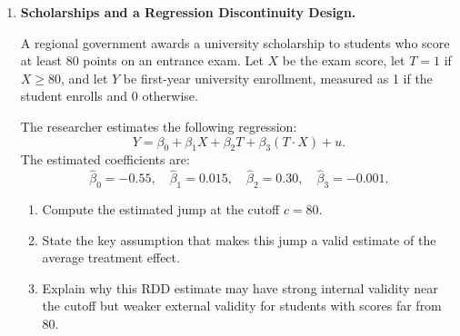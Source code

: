 \documentclass[12pt]{article}
\begin{document}
\begin{enumerate}
\begin{enumerate}[label=(\alph*)]
        \item The treatment effect is the predicted difference between \(T=1\) and \(T=0\), holding baseline political interest fixed:
        \[
            (\beta_0 + \beta_1 + \beta_2\text{interest} + \beta_3\text{interest})
            - (\beta_0 + \beta_2\text{interest})
            = \beta_1 + \beta_3\text{interest}.
        \]
        For \(\text{interest}=4\), the treatment effect is
        \[
            \beta_1 + 4\beta_3.
        \]
    \end{enumerate}
    \fi \color{black}

    \item \textbf{Scholarships and a Regression Discontinuity Design.}

    A regional government awards a university scholarship to students who score at least 80 points on an entrance exam. Let \(X\) be the exam score, let \(T=1\) if \(X \geq 80\), and let \(Y\) be first-year university enrollment, measured as 1 if the student enrolls and 0 otherwise.

    The researcher estimates the following regression:
    \[
        Y = \beta_0 + \beta_1X + \beta_2T + \beta_3(T\cdot X) + u.
    \]
    The estimated coefficients are:
    \[
        \widehat\beta_0 = -0.55, \quad
        \widehat\beta_1 = 0.015, \quad
        \widehat\beta_2 = 0.30, \quad
        \widehat\beta_3 = -0.001.
    \]

    \begin{enumerate}[label=(\alph*)]
        \item Compute the estimated jump at the cutoff \(c=80\).
        \item State the key assumption that makes this jump a valid estimate of the average treatment effect.
        \item Explain why this RDD estimate may have strong internal validity near the cutoff but weaker external validity for students with scores far from 80.
    \end{enumerate}


\end{enumerate}
\end{document}
